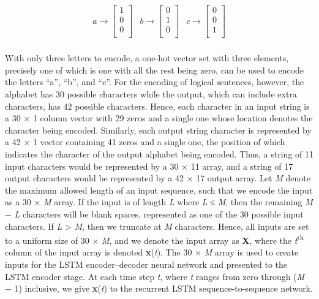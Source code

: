 \documentclass[
]{article}
\begin{document}
\[\begin{matrix}
a \rightarrow \begin{bmatrix}
1 \\
0 \\
0 \\
\end{bmatrix} & b \rightarrow \begin{bmatrix}
0 \\
1 \\
0 \\
\end{bmatrix} & c \rightarrow \begin{bmatrix}
0 \\
0 \\
1 \\
\end{bmatrix} \\
\end{matrix}\]

With only three letters to encode, a one-hot vector set with three
elements, precisely one of which is one with all the rest being zero,
can be used to encode the letters ``a'', ``b'', and ``c''. For the
encoding of logical sentences, however, the alphabet has 30 possible
characters while the output, which can include extra characters, has 42
possible characters. Hence, each character in an input string is a 30 ×
1 column vector with 29 zeros and a single one whose location denotes
the character being encoded. Similarly, each output string character is
represented by a 42 × 1 vector containing 41 zeros and a single one, the
position of which indicates the character of the output alphabet being
encoded. Thus, a string of 11 input characters would be represented by a
30 × 11 array, and a string of 17 output characters would be represented
by a 42 × 17 output array. Let \emph{M} denote the maximum allowed
length of an input sequence, such that we encode the input as a 30 ×
\emph{M} array. If the input is of length \emph{L} where \emph{L} ≤
\emph{M}, then the remaining \emph{M} − \emph{L} characters will be
blank spaces, represented as one of the 30 possible input characters. If
\emph{L} \textgreater{} \emph{M}, then we truncate at \emph{M}
characters. Hence, all inputs are set to a uniform size of 30 ×
\emph{M}, and we denote the input array as \textbf{X}, where the
\emph{t}\textsuperscript{th} column of the input array is denoted
\textbf{x}(\emph{t}). The 30 × \emph{M} array is used to create inputs
for the LSTM encoder--decoder neural network and presented to the LSTM
encoder stage. At each time step \emph{t}, where \emph{t} ranges from
zero through (\emph{M} − 1) inclusive, we give \textbf{x}(\emph{t}) to
the recurrent LSTM sequence-to-sequence network.
\end{document}
